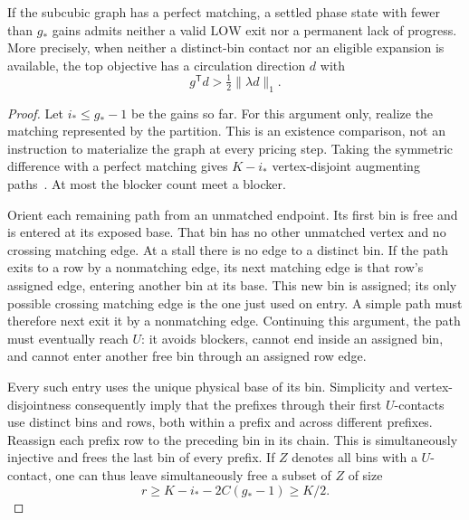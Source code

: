 \begin{lemma}
\label{phase:stall}
If the subcubic graph has a perfect matching, a settled phase
state with fewer than \(g_*\) gains admits neither a valid
\(\mathrm{LOW}\) exit nor a permanent lack of progress.
More precisely, when neither a distinct-bin contact nor an
eligible expansion is available, the top objective has a
circulation direction \(d\) with
\[
                      g^{\mathsf T}d
                           >\tfrac12\|\lambda d\|_1 .
 \]
\end{lemma}

\begin{proof}
Let \(i_*\le g_*-1\) be the gains so far.
For this argument only, realize the matching represented by the
partition.  This is an existence comparison, not an instruction
to materialize the graph at every pricing step.
Taking the symmetric difference with a perfect matching gives \(K-i_*\)
vertex-disjoint augmenting paths~\cite{Berge1957}.  At most the blocker count
meet a blocker.

Orient each remaining path from an unmatched endpoint.
Its first bin is free and is entered at its exposed base.
That bin has no other unmatched vertex and no crossing matching
edge.  At a stall there is no edge to a distinct bin.
If the path exits to a row by a nonmatching edge, its next
matching edge is that row's assigned edge, entering another
bin at its base.  This new bin is assigned; its only possible
crossing matching edge is the one just used on entry.
A simple path must therefore next exit it by a nonmatching
edge.  Continuing this argument, the path must eventually
reach \(U\): it avoids blockers, cannot end inside an assigned
bin, and cannot enter another free bin through an assigned
row edge.

Every such entry uses the unique physical base of its bin.
Simplicity and vertex-disjointness consequently imply that
the prefixes through their first \(U\)-contacts use distinct
bins and rows, both within a prefix and across different
prefixes.  Reassign each prefix row to the preceding bin in
its chain.  This is simultaneously injective and frees the
last bin of every prefix.
If \(Z\) denotes all bins with a \(U\)-contact, one can thus
leave simultaneously free a subset of \(Z\) of size
\begin{equation}
\label{phase:free-contacts}
 r\ge K-i_*-2C(g_*-1)\ge K/2 .
\end{equation}


\end{proof}
